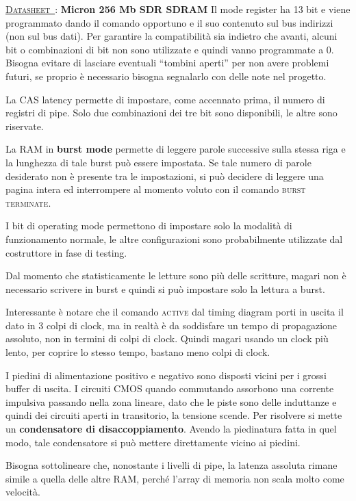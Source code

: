 \documentclass[11pt,4paper]{report}
\newcounter{datasheetcnt}
\renewcommand{\thedatasheetcnt}{\arabic{datasheetcnt}}
\newenvironment{datasheet}[2]{\refstepcounter{datasheetcnt}\par\bigskip\medskip \label{#2}
	\noindent \underline{\textsc{Datasheet~\thedatasheetcnt}}: \textbf{#1} \newline}{\medskip}
\begin{document}
\begin{datasheet}{Micron 256 Mb SDR SDRAM}{}
Il mode register ha 13 bit e viene programmato dando il comando opportuno e il suo contenuto sul bus indirizzi (non sul bus dati). Per garantire la compatibilità sia indietro che avanti, alcuni bit o combinazioni di bit non sono utilizzate e quindi vanno programmate a 0. Bisogna evitare di lasciare eventuali ``tombini aperti'' per non avere problemi futuri, se proprio è necessario bisogna segnalarlo con delle note nel progetto.

La CAS latency permette di impostare, come accennato prima, il numero di registri di pipe. Solo due combinazioni dei tre bit sono disponibili, le altre sono riservate.

La RAM in \textbf{burst mode} permette di leggere parole successive sulla stessa riga e la lunghezza di tale burst può essere impostata. Se tale numero di parole desiderato non è presente tra le impostazioni, si può decidere di leggere una pagina intera ed interrompere al momento voluto con il comando \textsc{burst terminate}.

I bit di operating mode permettono di impostare solo la modalità di funzionamento normale, le altre configurazioni sono probabilmente utilizzate dal costruttore in fase di testing.

Dal momento che statisticamente le letture sono più delle scritture, magari non è necessario scrivere in burst e quindi si può impostare solo la lettura a burst.

Interessante è notare che il comando \textsc{active} dal timing diagram porti in uscita il dato in 3 colpi di clock, ma in realtà è da soddisfare un tempo di propagazione assoluto, non in termini di colpi di clock. Quindi magari usando un clock più lento, per coprire lo stesso tempo, bastano meno colpi di clock.

I piedini di alimentazione positivo e negativo sono disposti vicini per i grossi buffer di uscita. I circuiti CMOS quando commutando assorbono una corrente impulsiva passando nella zona lineare, dato che le piste sono delle induttanze e quindi dei circuiti aperti in transitorio, la tensione scende. Per risolvere si mette un \textbf{condensatore di disaccoppiamento}. Avendo la piedinatura fatta in quel modo, tale condensatore si può mettere direttamente vicino ai piedini.

Bisogna sottolineare che, nonostante i livelli di pipe, la latenza assoluta rimane simile a quella delle altre RAM, perché l'array di memoria non scala molto come velocità.
\end{datasheet}
\end{document}
